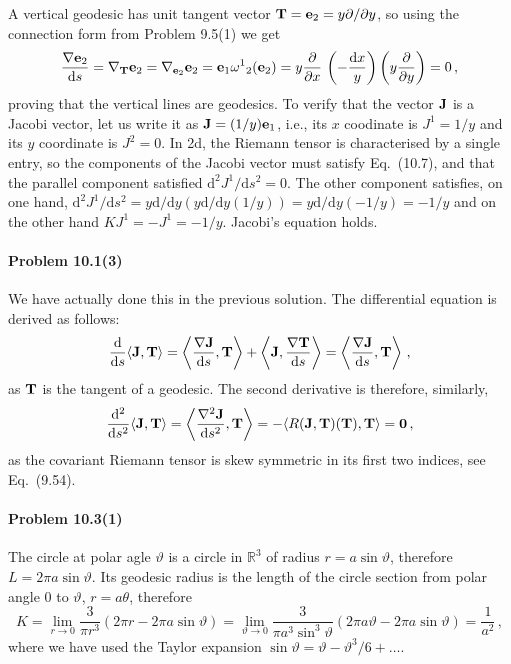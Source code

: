 \documentclass[a4paper,12pt]{article}
\def\d{\mathrm{d}}
\newcommand{\problem}[1]{\paragraph{Problem #1}}
\begin{document}
A vertical geodesic has unit tangent vector ${\bf T} = {\bf e}_2 = y \partial/\partial y$, so using the connection form from Problem 9.5(1) we get
\[
 \frac{\nabla {\bf e}_2}{\d s}=\nabla_{\bf T}{\bf e}_2=\nabla_{{\bf e}_2}{\bf e}_2 = {\bf e}_1 \omega^1{}_2({\bf e}_2) = y \frac{\partial}{\partial x}\,\left( -\frac{\d x}{y}\right)\left( y\frac{\partial}{\partial y}\right)=0\,,
\]
proving that the vertical lines are geodesics. To verify that the vector ${\bf J}$ is a Jacobi vector, let us write it as ${\bf J} = (1/y) {\bf e}_1$, i.e., its $x$ coodinate is $J^1=1/y$ and its $y$ coordinate is $J^2=0$. In 2d, the Riemann tensor is characterised by a single entry, so the components of the Jacobi vector must satisfy Eq.\ (10.7), and that the parallel component satisfied $\d^2 J^1/\d s^2=0$. The other component satisfies, on one hand, $\d^2 J^1/\d s^2 = y \d/\d y(y \d/\d y (1/y)) = y \d/\d y(-1/y) = -1/y$ and on the other hand $K J^1 = - J^1 = -1/y$. Jacobi's equation holds.


\problem{10.1(3)} We have actually done this in the previous solution. The differential equation is derived as follows:
\[
 \frac{\d}{\d s}\langle {\bf J}, {\bf T} \rangle = \left\langle \frac{\nabla\bf J}{\d s}, {\bf T}\right\rangle + \left\langle {\bf J}, \frac{\nabla \bf T}{\d s}\right\rangle = \left\langle \frac{\nabla\bf J}{\d s}, {\bf T}\right\rangle\,,
\]
as ${\bf T}$ is the tangent of a geodesic. The second derivative is therefore, similarly,
\[
 \frac{\d^2}{\d s^2}\langle {\bf J},{\bf T}\rangle = \left\langle \frac{\nabla^2\bf J}{\d s^2}, {\bf T}\right\rangle = -\langle R({\bf J}, {\bf T})(\bf T), {\bf T}\rangle = 0\,,
\]
as the covariant Riemann tensor is skew symmetric in its first two indices, see Eq.\ (9.54).


\problem{10.3(1)} The circle at polar agle $\vartheta$ is a circle in $\mathbb{R}^3$ of radius $r=a\sin\vartheta$, therefore $L=2\pi a\sin\vartheta$. Its geodesic radius is the length of the circle section from polar angle $0$ to $\vartheta$, $r=a\theta$, therefore
\[
 K = \lim_{r\to0} \frac{3}{\pi r^3}(2\pi r - 2\pi a \sin\vartheta) = \lim_{\vartheta\to 0} \frac{3}{\pi a^3 \sin^3 \vartheta} (2\pi a \vartheta - 2\pi a \sin\vartheta) = \frac{1}{a^2}\,,
\]
where we have used the Taylor expansion $\sin\vartheta = \vartheta - \vartheta^3/6 + \dots$.
\end{document}
